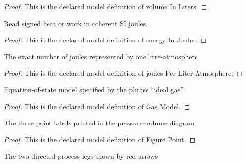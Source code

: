 \begin{proof}
  This is the declared model definition of volume In Liters.
\end{proof}
\begin{definition}
  \label{def:physics:phyx-mini-0492:phyxminiproblems-problemphyxmini0492-energyinjoules}
  Read signed heat or work in coherent SI joules
\end{definition}
\begin{proof}
  This is the declared model definition of energy In Joules.
\end{proof}
\begin{definition}
  \label{def:physics:phyx-mini-0492:phyxminiproblems-problemphyxmini0492-joulesperliteratmosphere}
  The exact number of joules represented by one litre-atmosphere
\end{definition}
\begin{proof}
  This is the declared model definition of joules Per Liter Atmosphere.
\end{proof}
\begin{definition}
  \label{def:physics:phyx-mini-0492:phyxminiproblems-problemphyxmini0492-gasmodel}
  Equation-of-state model specified by the phrase “ideal gas”
\end{definition}
\begin{proof}
  This is the declared model definition of Gas Model.
\end{proof}
\begin{definition}
  \label{def:physics:phyx-mini-0492:phyxminiproblems-problemphyxmini0492-figurepoint}
  The three point labels printed in the pressure--volume diagram
\end{definition}
\begin{proof}
  This is the declared model definition of Figure Point.
\end{proof}
\begin{definition}
  \label{def:physics:phyx-mini-0492:phyxminiproblems-problemphyxmini0492-processleg}
  The two directed process legs shown by red arrows
\end{definition}

